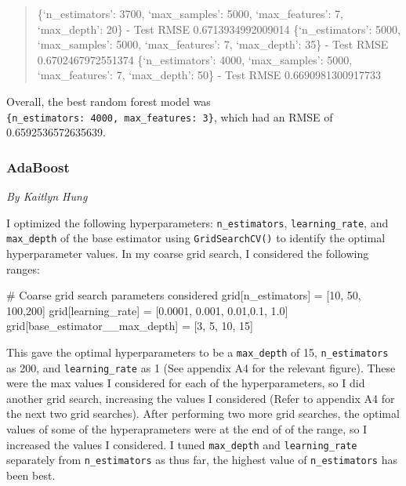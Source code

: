 \documentclass[
  letterpaper,
  DIV=11,
  numbers=noendperiod]{scrartcl}
\newenvironment{Shaded}{\begin{snugshade}}{\end{snugshade}}
\newcommand{\CommentTok}[1]{\textcolor[rgb]{0.37,0.37,0.37}{#1}}
\newcommand{\DecValTok}[1]{\textcolor[rgb]{0.68,0.00,0.00}{#1}}
\newcommand{\FloatTok}[1]{\textcolor[rgb]{0.68,0.00,0.00}{#1}}
\newcommand{\NormalTok}[1]{\textcolor[rgb]{0.00,0.23,0.31}{#1}}
\newcommand{\OperatorTok}[1]{\textcolor[rgb]{0.37,0.37,0.37}{#1}}
\newcommand{\StringTok}[1]{\textcolor[rgb]{0.13,0.47,0.30}{#1}}
\begin{document}
\begin{quote}
\{`n\_estimators': 3700, `max\_samples': 5000, `max\_features': 7,
`max\_depth': 20\} - Test RMSE 0.6713934992009014 \{`n\_estimators':
5000, `max\_samples': 5000, `max\_features': 7, `max\_depth': 35\} -
Test RMSE 0.6702467972551374 \{`n\_estimators': 4000, `max\_samples':
5000, `max\_features': 7, `max\_depth': 50\} - Test RMSE
0.6690981300917733
\end{quote}

Overall, the best random forest model was
\texttt{\{\textquotesingle{}n\_estimators\textquotesingle{}:\ 4000,\ \textquotesingle{}max\_features\textquotesingle{}:\ 3\}},
which had an RMSE of 0.6592536572635639.

\hypertarget{adaboost}{%
\subsubsection{AdaBoost}\label{adaboost}}

\emph{By Kaitlyn Hung}

I optimized the following hyperparameters: \texttt{n\_estimators},
\texttt{learning\_rate}, and \texttt{max\_depth} of the base estimator
using \texttt{GridSearchCV()} to identify the optimal hyperparameter
values. In my coarse grid search, I considered the following ranges:

\begin{Shaded}
\begin{Highlighting}[]
\CommentTok{\# Coarse grid search parameters considered}
\NormalTok{grid[}\StringTok{\textquotesingle{}n\_estimators\textquotesingle{}}\NormalTok{] }\OperatorTok{=}\NormalTok{ [}\DecValTok{10}\NormalTok{, }\DecValTok{50}\NormalTok{, }\DecValTok{100}\NormalTok{,}\DecValTok{200}\NormalTok{]}
\NormalTok{grid[}\StringTok{\textquotesingle{}learning\_rate\textquotesingle{}}\NormalTok{] }\OperatorTok{=}\NormalTok{ [}\FloatTok{0.0001}\NormalTok{, }\FloatTok{0.001}\NormalTok{, }\FloatTok{0.01}\NormalTok{,}\FloatTok{0.1}\NormalTok{, }\FloatTok{1.0}\NormalTok{]}
\NormalTok{grid[}\StringTok{\textquotesingle{}base\_estimator\_\_max\_depth\textquotesingle{}}\NormalTok{] }\OperatorTok{=}\NormalTok{ [}\DecValTok{3}\NormalTok{, }\DecValTok{5}\NormalTok{, }\DecValTok{10}\NormalTok{, }\DecValTok{15}\NormalTok{]}
\end{Highlighting}
\end{Shaded}

This gave the optimal hyperparameters to be a \texttt{max\_depth} of 15,
\texttt{n\_estimators} as 200, and \texttt{learning\_rate} as 1 (See
appendix A4 for the relevant figure). These were the max values I
considered for each of the hyperparameters, so I did another grid
search, increasing the values I considered (Refer to appendix A4 for the
next two grid searches). After performing two more grid searches, the
optimal values of some of the hyperaprameters were at the end of of the
range, so I increased the values I considered. I tuned
\texttt{max\_depth} and \texttt{learning\_rate} separately from
\texttt{n\_estimators} as thus far, the highest value of
\texttt{n\_estimators} has been best.
\end{document}
